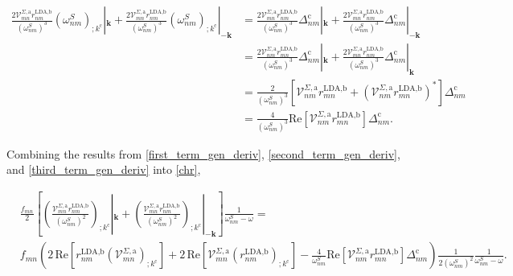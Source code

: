 \documentclass[10pt]{article}
\begin{document}
\begin{align}\label{third_term_gen_deriv}
\frac{2\mathcal{V}^{\Sigma,\text{a}}_{mn}r^{\text{LDA,b}}_{nm}}{(\omega^{S}_{nm})^{3}}\left(\omega^{S}_{nm}\right)_{;k^{\text{c}}}|_{\mathbf{k}} + \frac{2\mathcal{V}^{\Sigma,\text{a}}_{mn}r^{\text{LDA,b}}_{nm}}{(\omega^{S}_{nm})^{3}}\left(\omega^{S}_{nm}\right)_{;k^{\text{c}}}|_{-\mathbf{k}}
&= \frac{2\mathcal{V}^{\Sigma,\text{a}}_{mn}r^{\text{LDA,b}}_{nm}}{(\omega^{S}_{nm})^{3}}\Delta_{nm}^{\text{c}}|_{\mathbf{k}} + \frac{2\mathcal{V}^{\Sigma,\text{a}}_{mn}r^{\text{LDA,b}}_{nm}}{(\omega^{S}_{nm})^{3}}\Delta_{nm}^{\text{c}}|_{-\mathbf{k}}\nonumber\\
&= \frac{2\mathcal{V}^{\Sigma,\text{a}}_{nm}r^{\text{LDA,b}}_{mn}}{(\omega^{S}_{nm})^{3}}\Delta_{nm}^{\text{c}}|_{\mathbf{k}} + \frac{2\mathcal{V}^{\Sigma,\text{a}}_{mn}r^{\text{LDA,b}}_{nm}}{(\omega^{S}_{nm})^{3}}\Delta_{nm}^{\text{c}}|_{\mathbf{k}}\nonumber\\
&= \frac{2}{(\omega^{S}_{nm})^{3}}\left[\mathcal{V}^{\Sigma,\text{a}}_{nm}r^{\text{LDA,b}}_{mn} + \left(\mathcal{V}^{\Sigma,\text{a}}_{nm}r^{\text{LDA,b}}_{mn}\right)^{*}\right]\Delta_{nm}^{\text{c}}\nonumber\\
&= \frac{4}{(\omega^{S}_{nm})^{3}}\mathrm{Re}\left[\mathcal{V}^{\Sigma,\text{a}}_{nm}r^{\text{LDA,b}}_{mn}\right]\Delta_{nm}^{\text{c}}.
\end{align}

Combining the results from \eqref{first_term_gen_deriv}, \eqref{second_term_gen_deriv}, and \eqref{third_term_gen_deriv} into \eqref{chr},

\begin{align}\label{derivative_under_k}
&\frac{f_{mn}}{2}\left[\left(\frac{\mathcal{V}^{\Sigma,\text{a}}_{mn}r^{\text{LDA,b}}_{nm}}{(\omega^S_{nm})^2}\right)_{;k^{\text{c}}}|_{\mathbf{k}} + \left(\frac{\mathcal{V}^{\Sigma,\text{a}}_{mn}r^{\text{LDA,b}}_{nm}}{(\omega^S_{nm})^2}\right)_{;k^{\text{c}}}|_{-\mathbf{k}}\right]\frac{1}{\omega^S_{nm}-\omega} = \nonumber\\
&f_{mn}\left(2\,\mathrm{Re}\left[r^{\text{LDA,b}}_{nm}\left(\mathcal{V}^{\Sigma,\text{a}}_{mn}\right)_{;k^{\text{c}}}\right] + 2\,\mathrm{Re}\left[\mathcal{V}^{\Sigma,\text{a}}_{mn}\left(r^{\text{LDA,b}}_{nm}\right)_{;k^{\text{c}}}\right] - \frac{4}{\omega^{S}_{nm}}\mathrm{Re}\left[\mathcal{V}^{\Sigma,\text{a}}_{nm}r^{\text{LDA,b}}_{mn}\right]\Delta_{nm}^{\text{c}}\right)\frac{1}{2(\omega^{S}_{nm})^{2}}\frac{1}{\omega^S_{nm}-\omega}.
\end{align}
\end{document}
